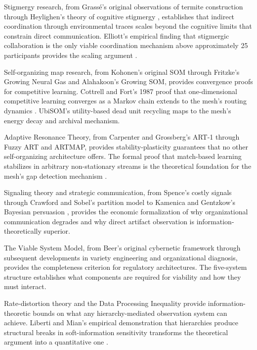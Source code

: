 \documentclass[11pt,a4paper]{article}
\begin{document}
Stigmergy research, from Grass\'{e}'s original observations of termite construction \citep{grasse1959} through Heylighen's theory of cognitive stigmergy \citep{heylighen2016}, establishes that indirect coordination through environmental traces scales beyond the cognitive limits that constrain direct communication. Elliott's empirical finding that stigmergic collaboration is the only viable coordination mechanism above approximately 25 participants provides the scaling argument \citep{elliott2007}.

Self-organizing map research, from Kohonen's original SOM \citep{kohonen1982} through Fritzke's Growing Neural Gas \citep{fritzke1995} and Alahakoon's Growing SOM, provides convergence proofs for competitive learning. Cottrell and Fort's 1987 proof that one-dimensional competitive learning converges as a Markov chain extends to the mesh's routing dynamics \citep{cottrell1987}. UbiSOM's utility-based dead unit recycling maps to the mesh's energy decay and archival mechanism.

Adaptive Resonance Theory, from Carpenter and Grossberg's ART-1 \citep{carpenter1987} through Fuzzy ART \citep{carpenter1991} and ARTMAP, provides stability-plasticity guarantees that no other self-organizing architecture offers. The formal proof that match-based learning stabilizes in arbitrary non-stationary streams is the theoretical foundation for the mesh's gap detection mechanism \citep{grossberg1976}.

Signaling theory and strategic communication, from Spence's costly signals \citep{spence1973} through Crawford and Sobel's partition model \citep{crawford1982} to Kamenica and Gentzkow's Bayesian persuasion \citep{kamenica2011}, provides the economic formalization of why organizational communication degrades and why direct artifact observation is information-theoretically superior.

The Viable System Model, from Beer's original cybernetic framework \citep{beer1972} through subsequent developments in variety engineering and organizational diagnosis, provides the completeness criterion for regulatory architectures. The five-system structure establishes what components are required for viability and how they must interact.

Rate-distortion theory and the Data Processing Inequality \citep{cover2006} provide information-theoretic bounds on what any hierarchy-mediated observation system can achieve. Liberti and Mian's empirical demonstration that hierarchies produce structural breaks in soft-information sensitivity transforms the theoretical argument into a quantitative one \citep{liberti2009}.
\end{document}
